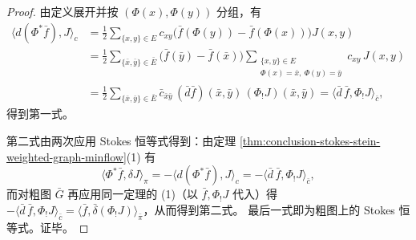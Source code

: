 \begin{proof}
由定义展开并按 \((\Phi(x),\Phi(y))\) 分组，有
\begin{align*}
\langle d(\Phi^\ast\bar f),J\rangle_c
&=\frac12\sum_{\{x,y\}\in E}c_{xy}\bigl(\bar f(\Phi(y))-\bar f(\Phi(x))\bigr)J(x,y)\\
&=\frac12\sum_{\{\bar x,\bar y\}\in\bar E}\bigl(\bar f(\bar y)-\bar f(\bar x)\bigr)
\sum_{\substack{\{x,y\}\in E\\ \Phi(x)=\bar x,\ \Phi(y)=\bar y}}c_{xy}\,J(x,y)\\
&=\frac12\sum_{\{\bar x,\bar y\}\in\bar E}\bar c_{\bar x\bar y}\,(\bar d\bar f)(\bar x,\bar y)\,(\Phi_!J)(\bar x,\bar y)
=\langle \bar d\,\bar f,\Phi_!J\rangle_{\bar c},
\end{align*}
得到第一式。
\par
第二式由两次应用 Stokes 恒等式得到：由定理 \ref{thm:conclusion-stokes-stein-weighted-graph-minflow}(1) 有
\[
\langle \Phi^\ast\bar f,\delta J\rangle_\pi=-\langle d(\Phi^\ast\bar f),J\rangle_c
=-\langle \bar d\,\bar f,\Phi_!J\rangle_{\bar c},
\]
而对粗图 \(\bar G\) 再应用同一定理的 (1)（以 \(\bar f,\Phi_!J\) 代入）得
\(
-\langle \bar d\,\bar f,\Phi_!J\rangle_{\bar c}=\langle \bar f,\bar\delta(\Phi_!J)\rangle_{\bar\pi}
\)，从而得到第二式。
最后一式即为粗图上的 Stokes 恒等式。证毕。
\end{proof}

